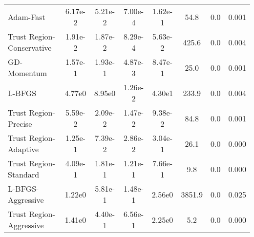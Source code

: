 \documentclass{article}
\begin{document}
\begin{table}[htbp]
{\begin{tabular}{p{2.5cm}*{7}{c}}
Adam-Fast & 6.17e-2 & 5.21e-2 & 7.00e-4 & 1.62e-1 & 54.8 & 0.0 & 0.001 \\
Trust Region-Conservative & 1.91e-2 & 1.87e-2 & 8.29e-4 & 5.63e-2 & 425.6 & 0.0 & 0.004 \\
GD-Momentum & 1.57e-1 & 1.93e-1 & 4.87e-3 & 8.47e-1 & 25.0 & 0.0 & 0.001 \\
L-BFGS & 4.77e0 & 8.95e0 & 1.26e-2 & 4.30e1 & 233.9 & 0.0 & 0.004 \\
Trust Region-Precise & 5.59e-2 & 2.09e-2 & 1.47e-2 & 9.38e-2 & 84.8 & 0.0 & 0.001 \\
Trust Region-Adaptive & 1.25e-1 & 7.39e-2 & 2.86e-2 & 3.04e-1 & 26.1 & 0.0 & 0.000 \\
Trust Region-Standard & 4.09e-1 & 1.81e-1 & 1.21e-1 & 7.66e-1 & 9.8 & 0.0 & 0.000 \\
L-BFGS-Aggressive & 1.22e0 & 5.81e-1 & 1.48e-1 & 2.56e0 & 3851.9 & 0.0 & 0.025 \\
Trust Region-Aggressive & 1.41e0 & 4.40e-1 & 6.56e-1 & 2.25e0 & 5.2 & 0.0 & 0.000 \\
\bottomrule
\end{tabular}
}
\end{table}
\end{document}

